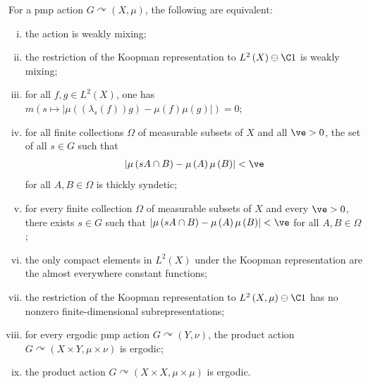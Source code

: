 \documentclass[10pt]{mypackage}
\begin{document}
\begin{theorem}
  For a pmp action $G\curvearrowright \left( X,\mu \right)$, the following are equivalent:
  \begin{enumerate}[(i)]
    \item the action is weakly mixing;
    \item the restriction of the Koopman representation to $L^2\left( X \right)\ominus \C 1$ is weakly mixing;
    \item for all $f,g\in L^2\left( X \right)$, one has $m\left( s\mapsto \left\vert \mu\left( \left( \lambda_s(f) \right)g \right) - \mu(f)\mu(g) \right\vert \right) = 0$;
    \item for all finite collections $\Omega$ of measurable subsets of $X$ and all $\ve > 0$, the set of all $s\in G$ such that 
      \begin{align*}
        \left\vert \mu\left( sA\cap B \right) - \mu\left( A \right)\mu\left( B \right) \right\vert < \ve
      \end{align*}
     for all $A,B\in \Omega$ is thickly syndetic;
    \item for every finite collection $\Omega$ of measurable subsets of $X$ and every $\ve > 0$, there exists $s\in G$ such that $\left\vert \mu\left( sA\cap B \right) - \mu\left( A \right)\mu\left( B \right) \right\vert < \ve$ for all $A, B\in \Omega$;
    \item the only compact elements in $L^2\left( X \right)$ under the Koopman representation are the almost everywhere constant functions;
    \item the restriction of the Koopman representation to $L^2\left( X,\mu \right)\ominus \C 1$ has no nonzero finite-dimensional subrepresentations;
    \item for every ergodic pmp action $G\curvearrowright \left( Y,\nu \right)$, the product action $G\curvearrowright \left( X\times Y,\mu\times\nu \right)$ is ergodic;
    \item the product action $G\curvearrowright \left( X\times X,\mu\times \mu \right)$ is ergodic.
  \end{enumerate}
\end{theorem}
\end{document}
